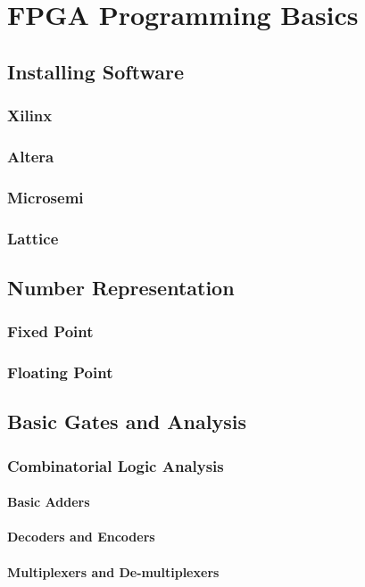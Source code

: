 \chapter{FPGA Programming Basics}

\section{Installing Software}
\subsection{Xilinx}
\subsection{Altera}
\subsection{Microsemi}
\subsection{Lattice}

\section{Number Representation}
\subsection{Fixed Point}
\subsection{Floating Point}

\section{Basic Gates and Analysis}
\subsection{Combinatorial Logic Analysis}
\subsubsection{Basic Adders}
\subsubsection{Decoders and Encoders}
\subsubsection{Multiplexers and De-multiplexers}
